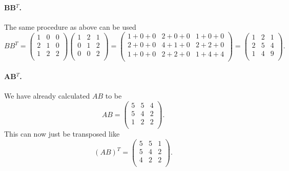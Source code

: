 \paragraph{BB$^{T}$.} The same procedure as above can be used
\[ 
BB^{T} = \begin{pmatrix}
1 & 0 & 0\\
2 & 1 & 0\\
1 & 2 & 2\\
\end{pmatrix} \begin{pmatrix}
1 & 2 & 1\\
0 & 1 & 2\\
0 & 0 & 2\\
\end{pmatrix} = \begin{pmatrix}
1 + 0 + 0 & 2 + 0 + 0 & 1 + 0 + 0\\
2 + 0 + 0 & 4 + 1 + 0 & 2 + 2 + 0\\
1 + 0 + 0 & 2 + 2 + 0 & 1 + 4 + 4\\
\end{pmatrix} = \begin{pmatrix}
1 & 2 & 1\\
2 & 5 & 4\\
1 & 4 & 9\\
\end{pmatrix}
.\]

\paragraph{AB$^{T}$.} We have already calculated $AB$ to be
\[ 
AB = \begin{pmatrix}
5 & 5 & 4\\
5 & 4 & 2\\
1 & 2 & 2\\
\end{pmatrix}
.\]
This can now just be transposed like
\[ 
  (AB)^{T} = \begin{pmatrix}
  5 & 5 & 1\\
  5 & 4 & 2\\
  4 & 2 & 2\\
  \end{pmatrix}
.\]




